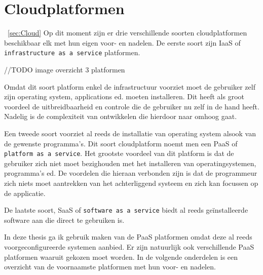 \section{Cloudplatformen}~\ref{sec:Cloud}
Op dit moment zijn er drie verschillende soorten cloudplatformen beschikbaar elk met hun eigen voor- en nadelen.
De eerste soort zijn IaaS of \texttt{infrastructure as a service} platformen.

//TODO image overzicht 3 platformen

Omdat dit soort platform enkel de infrastructuur voorziet moet de gebruiker zelf zijn operating system, applications ed. moeten installeren.
Dit heeft als groot voordeel de uitbreidbaarheid en controle die de gebruiker nu zelf in de hand heeft.
Nadelig is de complexiteit van ontwikkelen die hierdoor naar omhoog gaat.\newline

Een tweede soort voorziet al reeds de installatie van operating system alsook van de gewenste programma's.
Dit soort cloudplatform noemt men een PaaS of \texttt{platform as a service}.
Het grootste voordeel van dit platform is dat de gebruiker zich niet moet bezighouden met het installeren van operatingsystemen, programma's ed.
De voordelen die hieraan verbonden zijn is dat de programmeur zich niets moet aantrekken van het achterliggend systeem en zich kan focussen op de applicatie.

De laatste soort, SaaS of \texttt{software as a service} biedt al reeds geïnstalleerde software aan die direct te gebruiken is.

In deze thesis ga ik gebruik maken van de PaaS platformen omdat deze al reeds voorgeconfigureerde systemen aanbied.
Er zijn natuurlijk ook verschillende PaaS platformen waaruit gekozen moet worden.
In de volgende onderdelen is een overzicht van de voornaamste platformen met hun voor- en nadelen.


